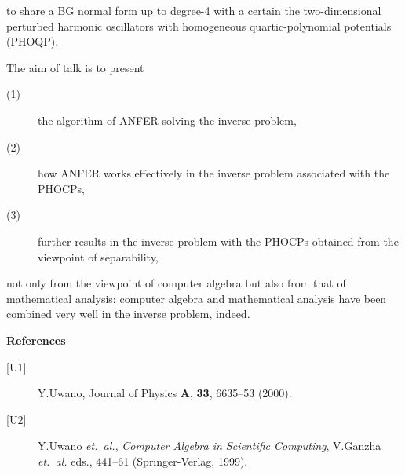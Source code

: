 to share a BG normal form up to degree-4 with a certain the two-dimensional
perturbed harmonic oscillators with homogeneous quartic-polynomial
potentials
(PHOQP).
\par
The aim of talk is to present
\begin{description}
\item[{(1)}]
the algorithm of ANFER solving the inverse problem,
\item[{(2)}]
how ANFER works effectively in the inverse problem
associated with the PHOCPs,
\item[{(3)}]
further results in the inverse problem with the PHOCPs
obtained from the viewpoint of separability,
\end{description}
not only from the viewpoint of computer algebra but also
from that of mathematical analysis: computer algebra and mathematical
analysis have been combined very well in the inverse problem, indeed.
\medskip
\baselineskip=14pt
\begin{center}
{\bf References}
\end{center}
\begin{description}
\item[{[U1]}]
Y.Uwano, Journal of Physics {\bf A}, {\bf 33}, 6635--53 (2000).
\item[{[U2]}]
Y.Uwano {\it et.~al.},
{\it Computer Algebra in Scientific Computing},
V.Ganzha {\it et.~al.} eds.,
441--61 (Springer-Verlag, 1999).
\end{description}

